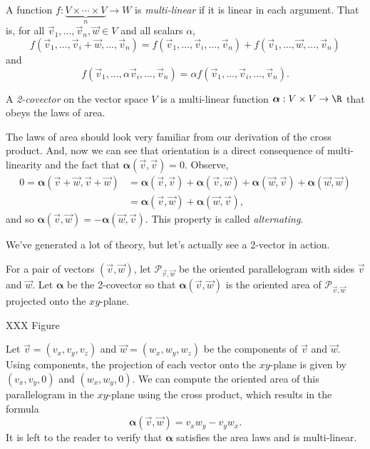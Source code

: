 \begin{definition}
	A function $f:\underbrace{V\times \cdots\times V}_{n}\to W$ is
	\emph{multi-linear} if it is linear in each argument.
	That is, for all $\vec v_1,\ldots, \vec v_n,\vec w\in V$ and 
	all scalars $\alpha$,
	\[
		f(\vec v_1,\ldots,\vec v_i+\vec w,\ldots,\vec v_n)
		=
		f(\vec v_1,\ldots,\vec v_i,\ldots,\vec v_n) +
		f(\vec v_1,\ldots,\vec w,\ldots,\vec v_n)
	\]
	and
	\[
		f(\vec v_1,\ldots,\alpha\vec v_i,\ldots,\vec v_n)
		=
		\alpha f(\vec v_1,\ldots,\vec v_i,\ldots,\vec v_n).
	\]
\end{definition}

\begin{definition}[2-covector]
	A \emph{2-covector} on the vector space $V$ is a multi-linear
	function $\bm\alpha: V\times V\to \R$ that obeys the laws of area.
\end{definition}

The laws of area should look very familiar from our 
derivation of the cross product.  And, now we can see that orientation
is a direct consequence of multi-linearity and the fact that $\bm\alpha(\vec v,\vec v)=0$.
Observe,
\begin{align*}
	0=\bm\alpha(\vec v+\vec w, \vec v+\vec w) &= 
		\bm\alpha(\vec v, \vec v)+
		\bm\alpha(\vec v, \vec w)+
		\bm\alpha(\vec w, \vec v)+
		\bm\alpha(\vec w,\vec w)\\
		&=\bm\alpha(\vec v, \vec w)+
		\bm\alpha(\vec w, \vec v),
\end{align*}
and so $\bm\alpha(\vec v, \vec w) = -\bm\alpha(\vec w, \vec v)$.  This property
is called \emph{alternating}.

We've generated a lot of theory, but let's actually see a 2-vector in action.

\begin{example}
	\label{EXTWOCOVECTOR}
	For a pair of vectors $(\vec v,\vec w)$, let $\mathcal P_{\vec v,\vec w}$
	be the oriented parallelogram with sides $\vec v$ and $\vec w$.
	Let $\bm\alpha$ be the 2-covector so that $\bm\alpha(\vec v,\vec w)$
	is the oriented area of $\mathcal P_{\vec v,\vec w}$ projected onto the
	$xy$-plane.

	XXX Figure

	Let $\vec v=(v_x,v_y,v_z)$ and $\vec w=(w_x,w_y,w_z)$ be the components
	of $\vec v$ and $\vec w$.  Using components, the projection of each
	vector onto the $xy$-plane is given by $(v_x,v_y,0)$ and $(w_x,w_y,0)$.
	We can compute the oriented area of this parallelogram in the $xy$-plane
	using the cross product, which
	results in the formula
	\[
		\bm\alpha(\vec v,\vec w) = v_xw_y-v_yw_x.
	\]
	It is left to the reader to verify that $\bm\alpha$ satisfies the area
	laws and is multi-linear.
\end{example}

